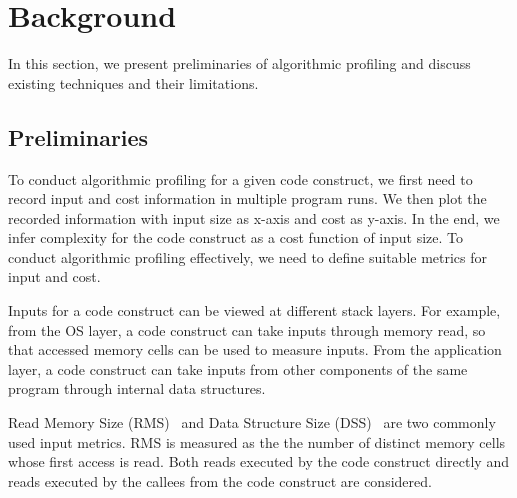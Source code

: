 
\section{Background}
\label{sec:back}

In this section, we present preliminaries of 
algorithmic profiling and discuss existing techniques and their
limitations. 

\subsection{Preliminaries}
\label{subsec:pre}

To conduct algorithmic profiling for a given code construct,
we first need to record input and cost information in multiple program runs. 
We then plot the recorded information with input size as x-axis and cost as y-axis.
In the end, we infer complexity for the code construct as a cost function of input size. 
To conduct algorithmic profiling effectively, 
we need to define suitable metrics for input and cost. 

%
Inputs for a code construct can be viewed at different stack layers.
For example, from the OS layer, a code construct can take 
inputs through memory read, 
so that accessed memory cells can be used to measure inputs.
From the application layer, a code construct can take inputs 
from other components of the same 
program through internal data structures. 

Read Memory Size (RMS)~\citep{Aprof1,Aprof2}  and Data Structure Size (DSS)~\citep{AlgoProf} 
are two commonly used input metrics. 
RMS is measured as the the number of distinct memory cells 
whose first access is read. Both reads executed by the code 
construct directly and  reads executed by the callees from 
the code construct are considered. 



